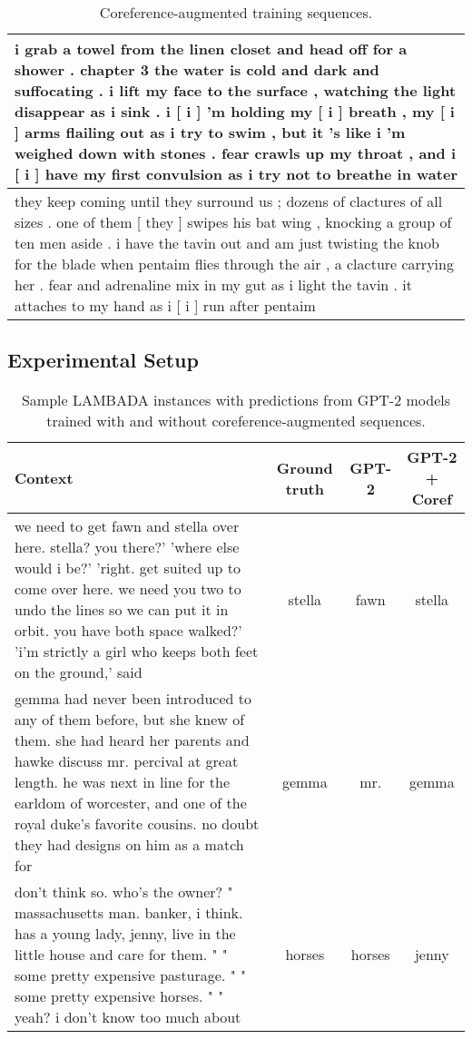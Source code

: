 \documentclass[12pt]{thesis-umich}[thesis]
\begin{document}
\begin{table}[t]
\small
    \centering
    \begin{tabular}{p{} }
    \toprule
    i grab a towel from the linen closet and head off for a shower . chapter 3 the water is cold and dark and suffocating . i lift my face to the surface , watching the light disappear as i sink . i [ i  ] 'm holding my [ i ] breath , my [ i  ] arms flailing out as i try to swim , but it 's like i 'm weighed down with stones . fear crawls up my throat , and i [ i  ] have my first convulsion as i try not to breathe in water \\\midrule
they keep coming until they surround us ; dozens of clactures of all sizes . one of them [ they  ] swipes his bat wing , knocking a group of ten men aside . i have the tavin out and am just twisting the knob for the blade when pentaim flies through the air , a clacture carrying her . fear and adrenaline mix in my gut as i light the tavin . it attaches to my hand as i [ i  ] run after pentaim \\
    \bottomrule
    \end{tabular}
    \caption{Coreference-augmented training sequences.}
    \label{tab:coref_aug_sequences}
\end{table}


\subsection{Experimental Setup}
\begin{table}[t]
\footnotesize
    \centering
    \begin{tabular}{p{} c c c }
    \toprule
    \textbf{Context} & \textbf{Ground truth} & \textbf{GPT-2} & \textbf{GPT-2 + Coref} \\
    \midrule
    we need to get fawn and stella over here. stella? you there?' 'where else would i be?' 'right. get suited up to come over here. we need you two to undo the lines so we can put it in orbit. you have both space walked?'  'i'm strictly a girl who keeps both feet on the ground,' said              &  stella & fawn & \textcolor{dkgreen}{stella} \\\midrule
    gemma had never been introduced to any of them before, but she knew of them. she had heard her parents and hawke discuss mr. percival at great length. he was next in line for the earldom of worcester, and one of the royal duke's favorite cousins. no doubt they had designs on him as a match for & gemma & mr. & \textcolor{dkgreen}{gemma} \\\midrule
     don't think so. who's the owner?  " massachusetts man. banker, i think. has a young lady, jenny, live in the little house and care for them. " " some pretty expensive pasturage. " " some pretty expensive horses. " " yeah? i don't know too much about & horses & \textcolor{dkgreen}{horses} & jenny \\ \bottomrule
    \end{tabular}
    \caption{Sample LAMBADA instances with predictions from GPT-2 models trained with and without coreference-augmented sequences. }
    \label{tab:lambada_pred}
\end{table}
\end{document}
